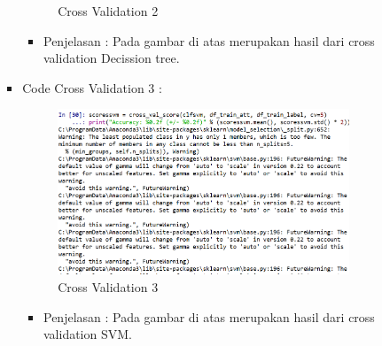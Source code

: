 \begin{enumerate}
\begin{itemize}
\begin{itemize}
\begin{itemize}
\begin{figure}[ht]
\caption{Cross Validation 2}
\label{contoh}
\end{figure}
\par
\begin{itemize}
\item Penjelasan : Pada gambar di atas merupakan hasil dari cross validation Decission tree.
\par
\par
\end{itemize}
\item Code Cross Validation 3 :
\par
\begin{figure}[ht]
\centering
\includegraphics[scale=0.7]{figures/andi/RF29.PNG}
\caption{Cross Validation 3}
\label{contoh}
\end{figure}
\par
\begin{itemize}
\item Penjelasan : Pada gambar di atas merupakan hasil dari cross validation SVM.
\par
\par
\end{itemize}
\end{itemize}




\end{itemize}
\end{itemize}
\end{enumerate}
